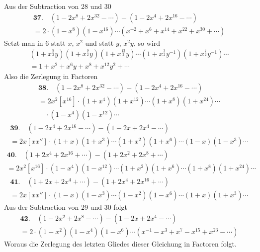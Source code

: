 \documentclass[10pt,a4paper]{article}
\begin{document}
Aus der Subtraction von 28 und 30
%
\begin{multline*}
\textbf{37.} \quad (1 - 2x^8 + 2x^{32} - \cdots) - (1 - 2x^4 + 2x^{16} - \cdots) \\
= 2 \cdot (1 - x^8)(1 - x^{16}) \cdots (x^{-2} + x^6 + x^{14} + x^{22} + x^{30} + \cdots)
\end{multline*}
%
Setzt man in 6 statt $x$, $x^2$ und statt $y$, $x^2y$, so wird
%
\begin{multline*}
(1 + x^{\frac{5}{2}}y)(1 + x^{\frac{9}{2}}y)(1 + x^{\frac{13}{2}}y) \cdots (1 + x^{\frac{3}{2}}y^{-1})(1 + x^{\frac{7}{2}}y^{-1}) \cdots \\
= 1 + x^2 + x^6y + x^8 + x^{12}y^2 + \cdots
\end{multline*}
%
Also die Zerlegung in Factoren
%
\begin{multline*}
\textbf{38.} \quad (1 - 2x^8 + 2x^{32} - \cdots) - (1 - 2x^4 + 2x^{16} - \cdots) \\
= 2x^2[x^{16}] \cdot (1 + x^4)(1 + x^{12}) \cdots (1 + x^8)(1 + x^{24}) \cdots \\
\quad \cdot (1 - x^4)(1 - x^{12}) \cdots
\end{multline*}
%
\begin{multline*}
\textbf{39.} \quad (1 - 2x^4 + 2x^{16} - \cdots) - (1 - 2x + 2x^4 - \cdots) \\
= 2x[xx''] \cdot (1 + x)(1 + x^3) \cdots (1 + x^2)(1 + x^6) \cdots (1 - x)(1 - x^3) \cdots
\end{multline*}
%
\begin{multline*}
\textbf{40.} \quad (1 + 2x^4 + 2x^{16} + \cdots) - (1 + 2x^2 + 2x^8 + \cdots) \\
= 2x^2[x^{16}] \cdot (1 - x^4)(1 - x^{12}) \cdots (1 + x^2)(1 + x^6) \cdots (1 + x^8)(1 + x^{24}) \cdots
\end{multline*}
%
\begin{multline*}
\textbf{41.} \quad (1 + 2x + 2x^4 + \cdots) - (1 + 2x^4 + 2x^{16} + \cdots) \\
= 2x[xx''] \cdot (1 - x)(1 - x^3) \cdots (1 - x^2)(1 - x^6) \cdots (1 + x)(1 + x^3) \cdots
\end{multline*}
%
Aus der Subtraction von 29 und 30 folgt
%
\begin{multline*}
\textbf{42.} \quad (1 - 2x^2 + 2x^8 - \cdots) - (1 - 2x + 2x^4 - \cdots) \\
= 2 \cdot (1 - x^2)(1 - x^4)(1 - x^6) \cdots (x^{-1} - x^3 + x^7 - x^{15} + x^{23} - \cdots)
\end{multline*}
%
Woraus die Zerlegung des letzten Gliedes dieser Gleichung in Factoren folgt.
\end{document}

